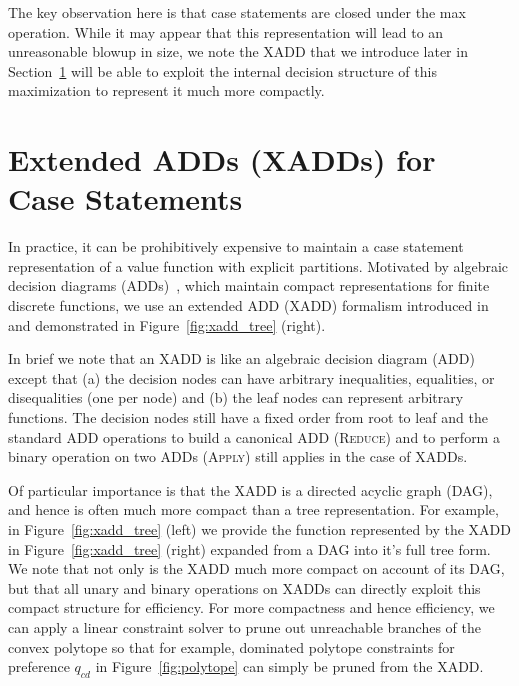 \documentclass[letterpaper]{article}
\begin{document}
The key observation here is that case statements are closed under the
max operation.  While it may appear that this representation will lead
to an unreasonable blowup in size, we note the XADD that we introduce
later in Section~\ref{sec:xadd} will be able to exploit the internal
decision structure of this maximization to represent it much more
compactly.

\section{Extended ADDs (XADDs) for Case Statements}

\label{sec:xadd}

In practice, it can be prohibitively expensive to maintain a case
statement representation of a value function with explicit partitions.
Motivated by algebraic decision diagrams (ADDs)~\cite{bahar93add},
which maintain compact representations for finite discrete functions,
we use an extended ADD (XADD) formalism introduced 
in~\cite{uai11} and demonstrated in 
Figure~\ref{fig:xadd_tree} (right).

In brief we note that an XADD is like an algebraic decision 
diagram (ADD)~\cite{bahar93add} except that (a) the decision
nodes can have arbitrary inequalities, equalities, or disequalities (one
per node) and (b) the leaf nodes can represent arbitrary functions.
The decision nodes still have a fixed order from root to leaf
and the standard ADD
operations to build a canonical ADD (\textsc{Reduce}) and 
to perform a binary operation on two ADDs (\textsc{Apply}) 
still applies in the case of XADDs. 

Of particular importance is that the XADD is a directed acyclic graph
(DAG), and hence is often much more compact than a tree
representation.  For example, in Figure~\ref{fig:xadd_tree} (left) we provide
the function represented by the XADD in Figure~\ref{fig:xadd_tree} (right) 
expanded from a DAG into it's full tree form.  We note that not only is
the XADD much more compact on account of its DAG, but that all
unary and binary operations on XADDs can directly exploit this
compact structure for efficiency.  For more compactness and hence efficiency, 
we can apply a linear
constraint solver to prune out unreachable branches of the convex
polytope so that for example, dominated polytope constraints 
for preference $q_{cd}$ in Figure~\ref{fig:polytope} can simply
be pruned from the XADD.
\end{document}
